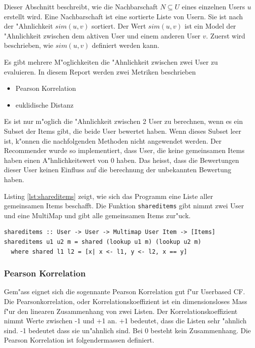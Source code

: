 \documentclass[a4paper, 12pt]{article}
\begin{document}
Dieser Abschnitt beschreibt, wie die Nachbarschaft  $N \subseteq U$ eines einzelnen Users $u$ erstellt wird. Eine Nachbarschaft ist eine sortierte Liste von Usern. Sie ist nach der "Ahnlichkeit $sim(u,v)$ sortiert.  Der Wert $sim(u,v)$ ist ein Model der "Ahnlichkeit zwischen dem aktiven User und einem anderen User $v$. Zuerst wird beschrieben, wie $sim(u,v)$ definiert werden kann.

Es gibt mehrere M"oglichkeiten die "Ahnlichkeit zwischen zwei User zu evaluieren. In diesem Report werden zwei Metriken beschrieben

\begin{itemize}
  \item Pearson Korrelation 
  \item euklidische Distanz
\end{itemize}


Es ist nur m"oglich die "Ahnlichkeit zwischen 2 User zu berechnen, wenn es ein Subset der Items gibt, die beide User bewertet haben. Wenn dieses Subset leer ist, k"onnen die nachfolgenden Methoden nicht angewendet werden. Der Recommender wurde so implementiert, dass User, die keine gemeinsamen Items haben einen A"hnlichkeitswert von 0 haben. Das heisst, dass die Bewertungen dieser User keinen Einfluss auf die berechnung der unbekannten Bewertung haben. 

Listing \ref{lst:shareditems} zeigt, wie sich das Programm eine Liste aller gemeinsamen Items beschafft. Die Funktion \verb|shareditems| gibt nimmt zwei User und eine MultiMap und gibt alle gemeinsamen Items zur"uck. 

\begin{lstlisting}[caption=Implementation von shareditems, label=lst:shareditems]
shareditems :: User -> User -> Multimap User Item -> [Items]
shareditems u1 u2 m = shared (lookup u1 m) (lookup u2 m)
  where shared l1 l2 = [x| x <- l1, y <- l2, x == y]
\end{lstlisting}

\subsubsection{Pearson Korrelation}
\label{sec:pearsoncorrelation}

Gem"ass \cite{jannach11} eignet sich die sogennante Pearson Korrelation gut f"ur Userbased CF. Die Pearsonkorrelation, oder Korrelationskoeffizient ist ein dimensionsloses Mass f"ur den linearen Zusammenhang von zwei Listen. Der Korrelationskoeffizient nimmt Werte zwischen -1 und +1 an. +1 bedeutet, dass die Listen sehr "ahnlich sind. -1 bedeutet dass sie un"ahnlich sind. Bei 0 besteht kein Zusammenhang. Die Pearson Korrelation ist folgendermassen definiert.
\end{document}
